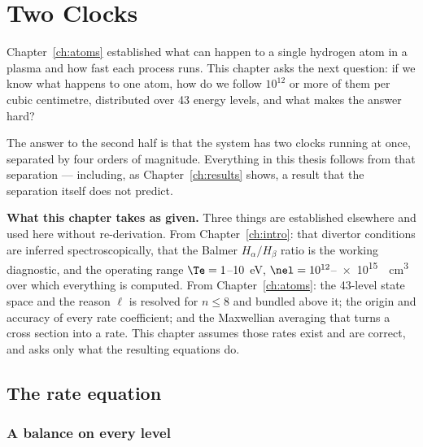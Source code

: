 
\chapter{Two Clocks}
\label{ch:theory}

Chapter~\ref{ch:atoms} established what can happen to a single hydrogen atom in
a plasma and how fast each process runs. This chapter asks the next question: if
we know what happens to one atom, how do we follow $10^{12}$ or more of them per
cubic centimetre, distributed over 43 energy levels, and what makes the answer
hard?

The answer to the second half is that the system has two clocks running at
once, separated by four orders of magnitude. Everything in this thesis follows
from that separation --- including, as Chapter~\ref{ch:results} shows, a result
that the separation itself does not predict.

\medskip
\noindent\textbf{What this chapter takes as given.} Three things are established
elsewhere and used here without re-derivation. From Chapter~\ref{ch:intro}: that
divertor conditions are inferred spectroscopically, that the Balmer
$H_\alpha/H_\beta$ ratio is the working diagnostic, and the operating range
$\Te = 1$--\SI{10}{\electronvolt}, $\nel = 10^{12}$--\SI{e15}{\per\cubic\centi\metre}
over which everything is computed. From Chapter~\ref{ch:atoms}: the 43-level
state space and the reason $\ell$ is resolved for $n \le 8$ and bundled above it;
the origin and accuracy of every rate coefficient; and the Maxwellian averaging
that turns a cross section into a rate. This chapter assumes those rates exist
and are correct, and asks only what the resulting equations do.

\section{The rate equation}
\label{sec:rate_equation}

\subsection{A balance on every level}

